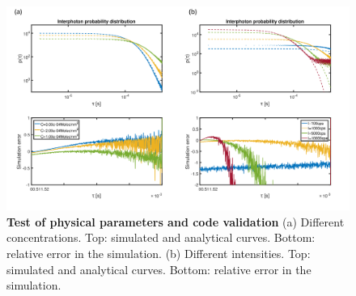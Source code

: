 \begin{figure}
 \includegraphics[width=\textwidth]{Theta_physical_test}%
 \caption{\textbf{Test of physical parameters and code validation} 
(a) Different concentrations. Top: simulated and analytical curves. Bottom: relative error in the simulation.
(b) Different intensities. Top: simulated and analytical curves. Bottom: relative error in the simulation.}
\label{fg:Theta_physical_test}
\end{figure}
